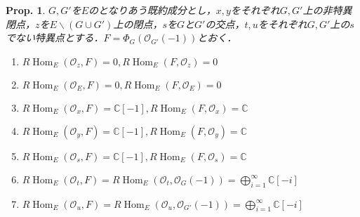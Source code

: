 \documentclass[uplatex,a4paper,11pt,dvipdfmx]{jsarticle}
\theoremstyle{mystyle} %
\newtheorem{proposition}{Prop.}[section]
\DeclareMathOperator{\Hom}{Hom}
\begin{document}
\begin{proposition}
	$G, G'$を$E$のとなりあう既約成分とし，$x,y$をそれぞれ$G, G'$上の非特異閉点，$z$を$E \backslash (G \cup G')$上の閉点，$s$を$G$と$G'$の交点，$t, u$をそれぞれ$G, G'$上の$s$でない特異点とする．$F = \Phi_G(\mathcal{O}_{G'}(-1))$とおく．
	\begin{enumerate}
		\item $R\Hom_E(\mathcal{O}_z, F) = 0, R\Hom_E(F,\mathcal{O}_z)=0$
		\item $R\Hom_E(\mathcal{O}_E, F) = 0, R\Hom_E(F,\mathcal{O}_E)=0$
		\item $R\Hom_E(\mathcal{O}_x, F) = \mathbb{C}[-1], R\Hom_E(F,\mathcal{O}_x)=\mathbb{C}$
		\item $R\Hom_E(\mathcal{O}_y, F) = \mathbb{C}[-1], R\Hom_E(F,\mathcal{O}_y)=\mathbb{C}$
		\item $R\Hom_E( \mathcal{O}_s, F) =\mathbb{C}[-1], R\Hom_E(F, \mathcal{O}_s) =\mathbb{C}$
		\item $R\Hom_E( \mathcal{O}_t, F) = R\Hom_E( \mathcal{O}_t, \mathcal{O}_G(-1)) = \bigoplus_{i=1}^\infty\mathbb{C}[-i]$
		\item $R\Hom_E(\mathcal{O}_u, F) = R\Hom_E( \mathcal{O}_u, \mathcal{O}_{G'}(-1)) = \bigoplus_{i=1}^\infty\mathbb{C}[-i]$
	\end{enumerate}
\end{proposition}
\end{document}
